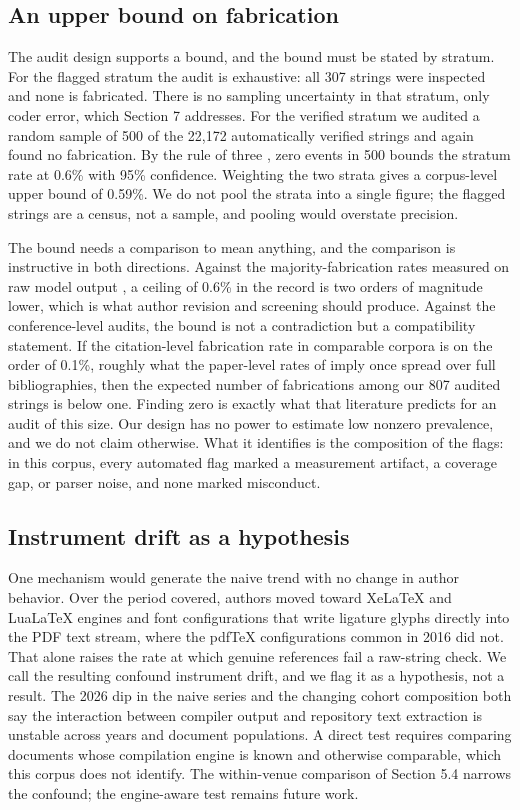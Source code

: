 \documentclass[11pt, a4paper]{article}
\begin{document}
\subsection{An upper bound on fabrication}
The audit design supports a bound, and the bound must be stated by stratum. For the flagged stratum the audit is exhaustive: all 307 strings were inspected and none is fabricated. There is no sampling uncertainty in that stratum, only coder error, which Section 7 addresses. For the verified stratum we audited a random sample of 500 of the 22{,}172 automatically verified strings and again found no fabrication. By the rule of three \citep{hanley1983}, zero events in 500 bounds the stratum rate at 0.6\% with 95\% confidence. Weighting the two strata gives a corpus-level upper bound of 0.59\%. We do not pool the strata into a single figure; the flagged strings are a census, not a sample, and pooling would overstate precision.

The bound needs a comparison to mean anything, and the comparison is instructive in both directions. Against the majority-fabrication rates measured on raw model output \citep{walters2023, bhattacharyya2023}, a ceiling of 0.6\% in the record is two orders of magnitude lower, which is what author revision and screening should produce. Against the conference-level audits, the bound is not a contradiction but a compatibility statement. If the citation-level fabrication rate in comparable corpora is on the order of 0.1\%, roughly what the paper-level rates of \citet{sakai2026} imply once spread over full bibliographies, then the expected number of fabrications among our 807 audited strings is below one. Finding zero is exactly what that literature predicts for an audit of this size. Our design has no power to estimate low nonzero prevalence, and we do not claim otherwise. What it identifies is the composition of the flags: in this corpus, every automated flag marked a measurement artifact, a coverage gap, or parser noise, and none marked misconduct.

\subsection{Instrument drift as a hypothesis}
One mechanism would generate the naive trend with no change in author behavior. Over the period covered, authors moved toward XeLaTeX and LuaLaTeX engines and font configurations that write ligature glyphs directly into the PDF text stream, where the pdfTeX configurations common in 2016 did not. That alone raises the rate at which genuine references fail a raw-string check. We call the resulting confound instrument drift, and we flag it as a hypothesis, not a result. The 2026 dip in the naive series and the changing cohort composition both say the interaction between compiler output and repository text extraction is unstable across years and document populations. A direct test requires comparing documents whose compilation engine is known and otherwise comparable, which this corpus does not identify. The within-venue comparison of Section 5.4 narrows the confound; the engine-aware test remains future work.
\end{document}

